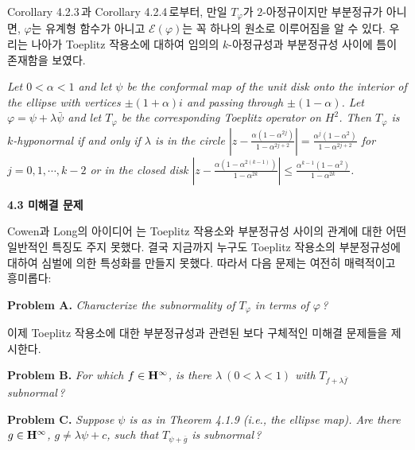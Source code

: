 \documentclass[12pt,a4paper,2sided]{article}
\begin{document}
Corollary 4.2.3\,과 Corollary 4.2.4\,로부터, 만일 $T_\varphi$가
$2$-아정규이지만 부분정규가 아니면, $\varphi$는 유계형 함수가 아니고
$\mathcal{E}(\varphi)$는 꼭 하나의 원소로 이루어짐을 알 수 있다.
우리는 나아가 Toeplitz 작용소에 대하여 임의의 $k$-아정규성과
부분정규성 사이에 틈이 존재함을 보였다.

\vspace{.2 cm}{\bf Theorem 4.2.5.} {\rm \cite{CLL}} {\sl Let
$0<\alpha<1$ and let $\psi$ be the conformal map of the unit disk
onto the interior of the ellipse with vertices $\pm(1+\alpha)i$ and
passing through $\pm(1-\alpha)$. Let $\varphi=\psi+\lambda\bar\psi$
and let $T_\varphi$ be the corresponding Toeplitz operator on $H^2$.
Then $T_\varphi$ is $k$-hyponormal if and only if $\lambda$ is in
the circle $\left|z-\frac{\alpha(1-\alpha^{2j})}
{1-\alpha^{2j+2}}\right|
=\frac{\alpha^j(1-\alpha^2)}{1-\alpha^{2j+2}}$ for $j=0,1,\cdots
,k-2 $ or in the closed disk
$\left|z-\frac{\alpha(1-\alpha^{2(k-1)})} {1-\alpha^{2k}}\right| \le
\frac{\alpha^{k-1}(1-\alpha^2)}{1-\alpha^{2k}}$. }

\vspace{.3 cm} {\bf 4.3 미해결 문제}

\vspace{.3 cm} Cowen과 Long의 아이디어 \cite{CoL}는 Toeplitz
작용소와 부분정규성 사이의 관계에 대한 어떤 일반적인 특징도 주지
못했다. 결국 지금까지 누구도 Toeplitz 작용소의 부분정규성에 대하여
심벌에 의한 특성화를 만들지 못했다. 따라서 다음 문제는 여전히
매력적이고 흥미롭다:

\vspace{.2 cm}

{\bf Problem A.}  {\sl Characterize the subnormality of
$T_\varphi$ in terms of $\varphi$\,? }

\vspace{.2 cm} 이제 Toeplitz 작용소에 대한 부분정규성과 관련된 보다
구체적인 미해결 문제들을 제시한다.



\newpage {} \vspace{.8 cm}

{\bf Problem B.}  {\sl For which $f\in{\bold H}^{\infty}$, is there
$\lambda\ (0<\lambda<1)$ with $T_{f +\lambda\overline{f}}$
subnormal\,? }

\vspace{.2 cm} {\bf Problem C.} {\sl Suppose $\psi$ is as in Theorem
4.1.9 (i.e., the ellipse map). Are there $g\in{\bold H}^{\infty}$,
$g\neq\lambda\psi +c$, such that $T_{\psi+\overline{g}}$ is
subnormal\,? }
\end{document}
